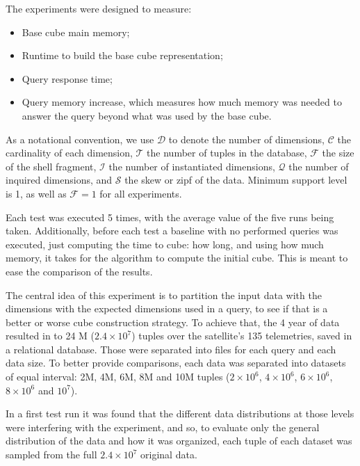 The experiments were designed to measure:

\begin{itemize}[noitemsep]
\item Base cube main memory;
\item Runtime to build the base cube representation;
\item Query response time;
\item Query memory increase, which measures how much memory was needed to answer the query beyond what was used by the base cube.
\end{itemize}

As a notational convention, we use \(\mathcal{D}\) to denote the number of dimensions, \(\mathcal{C}\) the cardinality of each dimension, \(\mathcal{T}\) the number of tuples in the database, \(\mathcal{F}\) the size of the shell fragment, \(\mathcal{I}\) the number of instantiated dimensions, \(\mathcal{Q}\) the number of inquired dimensions, and \(\mathcal{S}\) the skew or zipf of the data.
Minimum support level is 1, as well as \(\mathcal{F} = 1\) for all experiments.

Each test was executed 5 times, with the average value of the five runs being taken.
Additionally, before each test a baseline with no performed queries was executed, just computing the time to cube: how long, and using how much memory, it takes for the algorithm to compute the initial cube.
This is meant to ease the comparison of the results.

The central idea of this experiment is to partition the input data with the dimensions with the expected dimensions used in a query, to see if that is a better or worse cube construction strategy.
To achieve that, the 4 year of data resulted in to 24 M (\(\ensuremath{2.4\times 10^{7}}\)) tuples over the satellite's 135 telemetries, saved in a relational database.
Those were separated into files for each query and each data size.
To better provide comparisons, each data was separated into datasets of equal interval: 2M, 4M, 6M, 8M and 10M tuples (\(\ensuremath{2\times 10^{6}}\), \(\ensuremath{4\times 10^{6}}\), \(\ensuremath{6\times 10^{6}}\), \(\ensuremath{8\times 10^{6}}\) and \(\ensuremath{10^{7}}\)).

In a first test run it was found that the different data distributions at those levels were interfering with the experiment, and so, to evaluate only the general distribution of the data and how it was organized, each tuple of each dataset was sampled from the full \(\ensuremath{2.4\times 10^{7}}\) original data.


